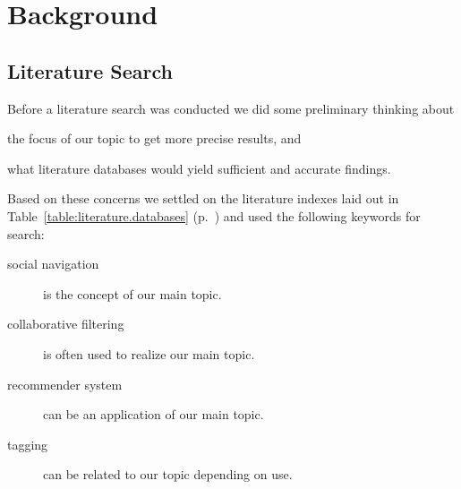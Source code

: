 \chapter{Background}
\label{chapter:background}

%
%
%
%
%
%
%

\section{Literature Search}

Before a literature search was conducted we did some preliminary thinking
about
\begin{inparaenum}[(a)]
  \item the focus of our topic to get more precise results, and
  \item what literature databases would yield sufficient and accurate
    findings.
\end{inparaenum}
Based on these concerns we settled on the literature indexes laid out in
Table~\ref{table:literature.databases}
(p.~\pageref{table:literature.databases}) and used the following keywords%
for search:

\begin{description}
  \item[social navigation] is the concept of our main topic.
  \item[collaborative filtering] is often used to realize our main topic.
  \item[recommender system] can be an application of our main topic.
  \item[tagging] can be related to our topic depending on use.
\end{description}

